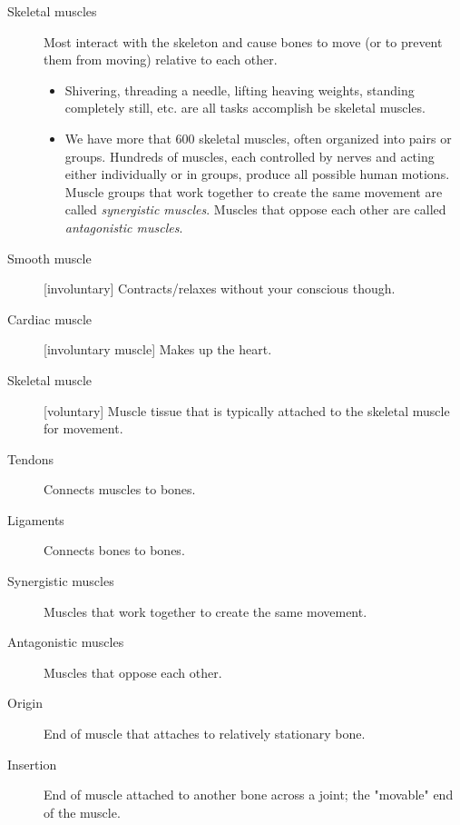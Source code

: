 \documentclass[11pt]{article}
\begin{document}
\begin{description}
\item[{Skeletal muscles}] Most interact with the skeleton and cause bones to
move (or to prevent them from moving) relative to each other.
\begin{itemize}
\item Shivering, threading a needle, lifting heaving weights, standing
completely still, etc. are all tasks accomplish be skeletal muscles.
\item We have more that 600 skeletal muscles, often organized into pairs or
groups. Hundreds of muscles, each controlled by nerves and acting
either individually or in groups, produce all possible human motions.
Muscle groups that work together to create the same movement are
called \emph{synergistic muscles}. Muscles that oppose each other are called
\emph{antagonistic muscles}.
\end{itemize}
\item[{Smooth muscle}] [involuntary] Contracts/relaxes without your conscious
though.
\item[{Cardiac muscle}] [involuntary muscle] Makes up the heart.
\item[{Skeletal muscle}] [voluntary] Muscle tissue that is typically attached
to the skeletal muscle for movement.
\item[{Tendons}] Connects muscles to bones.
\item[{Ligaments}] Connects bones to bones.
\item[{Synergistic muscles}] Muscles that work together to create the same
movement.
\item[{Antagonistic muscles}] Muscles that oppose each other.
\item[{Origin}] End of muscle that attaches to relatively stationary bone.
\item[{Insertion}] End of muscle attached to another bone across a joint; the
"movable" end of the muscle.
\end{description}
\end{document}
